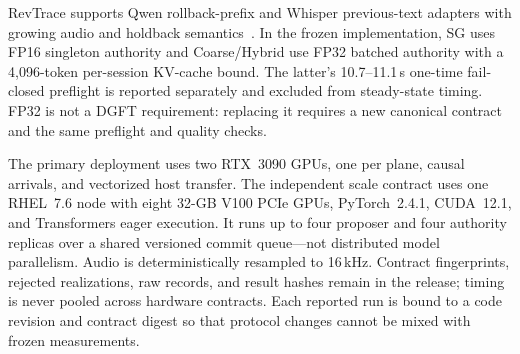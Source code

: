 
RevTrace supports Qwen rollback-prefix and Whisper previous-text adapters with
growing audio and holdback semantics~\cite{shi2026qwen3asr,radford2023whisper}.
In the frozen implementation, SG uses FP16 singleton authority and
Coarse/Hybrid use FP32 batched authority with a 4{,}096-token per-session
KV-cache bound. The latter's 10.7--11.1\,s one-time fail-closed preflight is
reported separately and excluded from steady-state timing. FP32 is not a DGFT
requirement: replacing it requires a new canonical contract and the same
preflight and quality checks.

The primary deployment uses two RTX~3090 GPUs, one per plane, causal arrivals,
and vectorized host transfer. The independent scale contract uses one
RHEL~7.6 node with eight 32-GB V100 PCIe GPUs, PyTorch~2.4.1, CUDA~12.1, and
Transformers eager execution. It runs up to four proposer and four authority
replicas over a shared versioned commit queue---not distributed model
parallelism. Audio is deterministically resampled to 16\,kHz. Contract
fingerprints, rejected realizations, raw records, and result hashes remain in
the release; timing is never pooled across hardware contracts. Each reported
run is bound to a code revision and contract digest so that protocol changes
cannot be mixed with frozen measurements.
\artifactavailability
